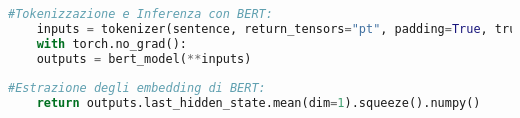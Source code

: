 \begin{lstlisting}[language=Python, caption=Utilizzo di PyTorch nel codice]
#Tokenizzazione e Inferenza con BERT:
	inputs = tokenizer(sentence, return_tensors="pt", padding=True, truncation=True, max_length=50)
	with torch.no_grad():
	outputs = bert_model(**inputs)
	
#Estrazione degli embedding di BERT:
	return outputs.last_hidden_state.mean(dim=1).squeeze().numpy()
\end{lstlisting}